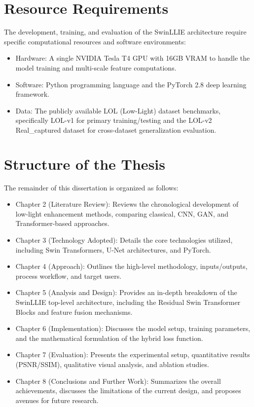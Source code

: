 \documentclass[12pt, a4paper]{report}
\begin{document}
\section{Resource Requirements}
The development, training, and evaluation of the SwinLLIE architecture require specific computational resources and software environments:
\begin{itemize}
    \item Hardware: A single NVIDIA Tesla T4 GPU with 16GB VRAM to handle the model training and multi-scale feature computations.
    \item Software: Python programming language and the PyTorch 2.8 deep learning framework.
    \item Data: The publicly available LOL (Low-Light) dataset benchmarks, specifically LOL-v1 for primary training/testing and the LOL-v2 Real\_captured dataset for cross-dataset generalization evaluation.
\end{itemize}

\section{Structure of the Thesis}
The remainder of this dissertation is organized as follows:
\begin{itemize}
    \item Chapter 2 (Literature Review): Reviews the chronological development of low-light enhancement methods, comparing classical, CNN, GAN, and Transformer-based approaches.
    \item Chapter 3 (Technology Adopted): Details the core technologies utilized, including Swin Transformers, U-Net architectures, and PyTorch.
    \item Chapter 4 (Approach): Outlines the high-level methodology, inputs/outputs, process workflow, and target users.
    \item Chapter 5 (Analysis and Design): Provides an in-depth breakdown of the SwinLLIE top-level architecture, including the Residual Swin Transformer Blocks and feature fusion mechanisms.
    \item Chapter 6 (Implementation): Discusses the model setup, training parameters, and the mathematical formulation of the hybrid loss function.
    \item Chapter 7 (Evaluation): Presents the experimental setup, quantitative results (PSNR/SSIM), qualitative visual analysis, and ablation studies.
    \item Chapter 8 (Conclusions and Further Work): Summarizes the overall achievements, discusses the limitations of the current design, and proposes avenues for future research.
\end{itemize}
\end{document}

